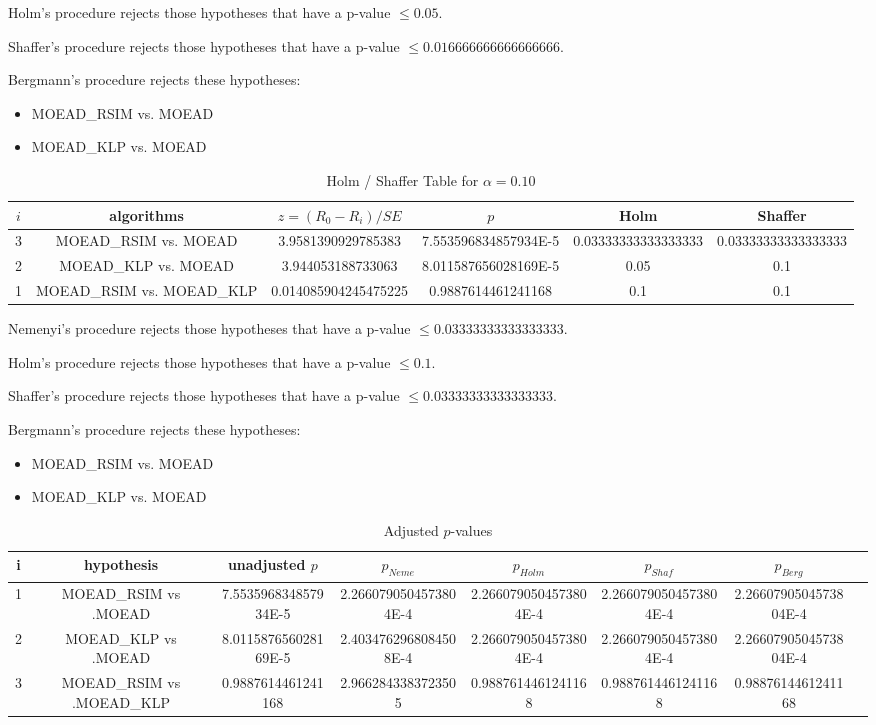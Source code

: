 \documentclass[a4paper,10pt]{article}
\begin{document}
\begin{landscape}
Holm's procedure rejects those hypotheses that have a p-value $\le0.05$.


Shaffer's procedure rejects those hypotheses that have a p-value $\le0.016666666666666666$.


Bergmann's procedure rejects these hypotheses:


\begin{itemize}


\item MOEAD_RSIM vs. MOEAD
\item MOEAD_KLP vs. MOEAD
\end{itemize}


\begin{table}[!htp]
\centering\tiny
\caption{Holm / Shaffer Table for $\alpha=0.10$}
\begin{tabular}{cccccc}
$i$&algorithms&$z=(R_0 - R_i)/SE$&$p$&Holm&Shaffer\\
\hline
3&MOEAD_RSIM vs. MOEAD&3.9581390929785383&7.553596834857934E-5&0.03333333333333333&0.03333333333333333\\
2&MOEAD_KLP vs. MOEAD&3.944053188733063&8.011587656028169E-5&0.05&0.1\\
1&MOEAD_RSIM vs. MOEAD_KLP&0.014085904245475225&0.9887614461241168&0.1&0.1\\
\hline
\end{tabular}
\end{table}
Nemenyi's procedure rejects those hypotheses that have a p-value $\le0.03333333333333333$.


Holm's procedure rejects those hypotheses that have a p-value $\le0.1$.


Shaffer's procedure rejects those hypotheses that have a p-value $\le0.03333333333333333$.


Bergmann's procedure rejects these hypotheses:


\begin{itemize}


\item MOEAD_RSIM vs. MOEAD
\item MOEAD_KLP vs. MOEAD
\end{itemize}


\begin{table}[!htp]
\centering\tiny
\caption{Adjusted $p$-values}
\begin{tabular}{cccccccc}
i&hypothesis&unadjusted $p$&$p_{Neme}$&$p_{Holm}$&$p_{Shaf}$&$p_{Berg}$\\
\hline
1&MOEAD_RSIM vs .MOEAD&7.553596834857934E-5&2.2660790504573804E-4&2.2660790504573804E-4&2.2660790504573804E-4&2.2660790504573804E-4\\
2&MOEAD_KLP vs .MOEAD&8.011587656028169E-5&2.4034762968084508E-4&2.2660790504573804E-4&2.2660790504573804E-4&2.2660790504573804E-4\\
3&MOEAD_RSIM vs .MOEAD_KLP&0.9887614461241168&2.9662843383723505&0.9887614461241168&0.9887614461241168&0.9887614461241168\\
\hline
\end{tabular}
\end{table}

\end{landscape}
\end{document}
